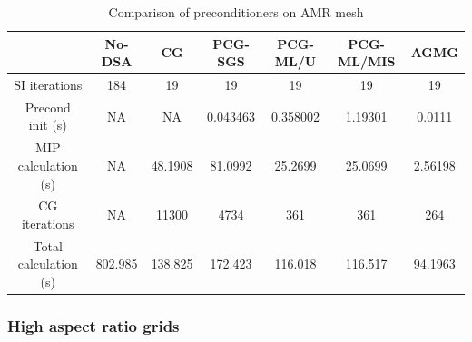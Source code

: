 %
\begin{table}[H]
  \caption{Comparison of preconditioners on AMR mesh}
  \begin{center}
    \begin{tabular}{|c|c|c|c|c|c|c|}
      \hline
       & No-DSA & CG & PCG-SGS & PCG-ML/U & PCG-ML/MIS & AGMG \\
      \hline
   SI iterations & 184     & 19      & 19       & 19      & 19       & 19 \\
Precond init (s) & NA      & NA      & 0.043463 & 0.358002 & 1.19301 & 0.0111\\
MIP calculation (s) & NA   & 48.1908 & 81.0992  & 25.2699 & 25.0699  & 
      2.56198\\
   CG iterations & NA      & 11300   & 4734     & 361     & 361      & 264 \\
     Total calculation (s) & 802.985 & 138.825 & 172.423  & 116.018 & 116.517  &
      94.1963\\
      \hline
    \end{tabular}
    \label{table_amr}
  \end{center}
\end{table}

\subsubsection{High aspect ratio grids}

